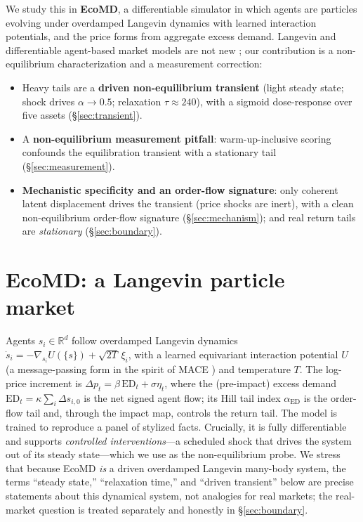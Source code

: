 \documentclass{article}
\begin{document}
We study this in \textbf{EcoMD}, a differentiable simulator in which agents are particles evolving
under overdamped Langevin dynamics with learned interaction potentials, and the price forms from
aggregate excess demand. Langevin and differentiable agent-based market models are not new
\citep{bouchaud1998,dyer2024,chopra2023}; our contribution is a non-equilibrium characterization and a
measurement correction:
\begin{itemize}\setlength{\itemsep}{1pt}
  \item Heavy tails are a \textbf{driven non-equilibrium transient} (light steady state; shock drives
    $\alpha\!\to\!0.5$; relaxation $\tau\!\approx\!240$), with a sigmoid dose-response over five assets
    (\S\ref{sec:transient}).
  \item A \textbf{non-equilibrium measurement pitfall}: warm-up-inclusive scoring confounds the
    equilibration transient with a stationary tail (\S\ref{sec:measurement}).
  \item \textbf{Mechanistic specificity and an order-flow signature}: only coherent latent displacement
    drives the transient (price shocks are inert), with a clean non-equilibrium order-flow signature
    (\S\ref{sec:mechanism}); and real return tails are \emph{stationary} (\S\ref{sec:boundary}).
\end{itemize}

\section{EcoMD: a Langevin particle market}\label{sec:ecomd}
Agents $s_i\!\in\!\mathbb{R}^d$ follow overdamped Langevin dynamics
$\dot s_i = -\nabla_{s_i}U(\{s\}) + \sqrt{2T}\,\xi_i$, with a learned equivariant interaction potential
$U$ (a message-passing form in the spirit of MACE \citep{batatia2022}) and temperature $T$. The
log-price increment is $\Delta p_t = \beta\,\mathrm{ED}_t + \sigma\eta_t$, where the (pre-impact)
excess demand $\mathrm{ED}_t=\kappa\sum_i\Delta s_{i,0}$ is the net signed agent flow; its Hill tail
index $\alpha_{\mathrm{ED}}$ \citep{hill1975} is the order-flow tail and, through the impact map,
controls the return tail.
The model is trained to reproduce a panel of stylized facts. Crucially, it is fully differentiable and
supports \emph{controlled interventions}---a scheduled shock that drives the system out of its steady
state---which we use as the non-equilibrium probe. We stress that because EcoMD \emph{is} a driven
overdamped Langevin many-body system, the terms ``steady state,'' ``relaxation time,'' and ``driven
transient'' below are precise statements about this dynamical system, not analogies for real markets;
the real-market question is treated separately and honestly in \S\ref{sec:boundary}.
\end{document}
